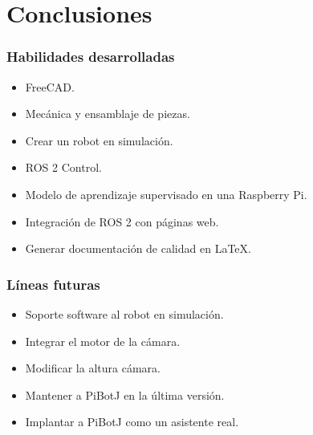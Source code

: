\documentclass{beamer}
\begin{document}
\section{Conclusiones}
\begin{frame}
\frametitle{Habilidades desarrolladas}
\begin{itemize}
\item FreeCAD.
\item Mecánica y ensamblaje de piezas.
\item Crear un robot en simulación.
\item ROS 2 Control.
\item Modelo de aprendizaje supervisado en una Raspberry Pi.
\item Integración de ROS 2 con páginas web.
\item Generar documentación de calidad en LaTeX.
\end{itemize}
\end{frame}
	

\begin{frame}
\frametitle{Líneas futuras}
\begin{itemize}
\item Soporte software al robot en simulación.
\item Integrar el motor de la cámara.
\item Modificar la altura cámara.
\item Mantener a PiBotJ en la última versión.
\item Implantar a PiBotJ como un asistente real.
\end{itemize}
\end{frame}

\begin{frame}[plain]
\large{\titlepage}
\end{frame}


\end{document}
